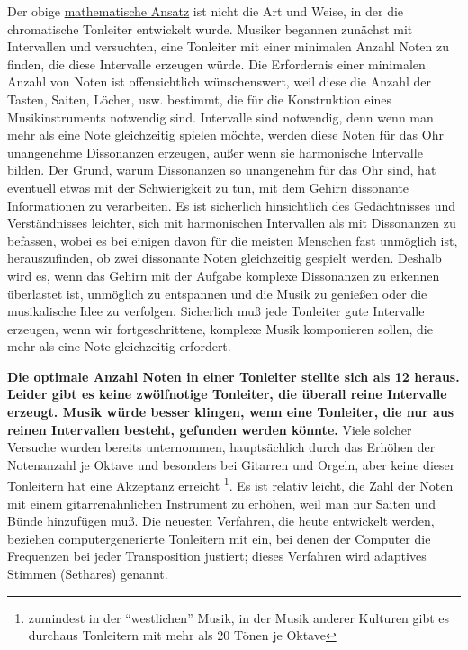 Der obige \hyperlink{c2_2b}{mathematische Ansatz} ist nicht die Art und Weise, in der die chromatische Tonleiter entwickelt wurde.
 Musiker begannen zunächst mit Intervallen und versuchten, eine Tonleiter mit einer minimalen Anzahl Noten zu finden, die diese Intervalle erzeugen würde.
 Die Erfordernis einer minimalen Anzahl von Noten ist offensichtlich wünschenswert, weil diese die Anzahl der Tasten, Saiten, Löcher, usw. bestimmt, die für die Konstruktion eines Musikinstruments notwendig sind.
 Intervalle sind notwendig, denn wenn man mehr als eine Note gleichzeitig spielen möchte, werden diese Noten für das Ohr unangenehme Dissonanzen erzeugen, außer wenn sie harmonische Intervalle bilden.
 Der Grund, warum Dissonanzen so unangenehm für das Ohr sind, hat eventuell etwas mit der Schwierigkeit zu tun, mit dem Gehirn dissonante Informationen zu verarbeiten.
 Es ist sicherlich hinsichtlich des Gedächtnisses und Verständnisses leichter, sich mit harmonischen Intervallen als mit Dissonanzen zu befassen, wobei es bei einigen davon für die meisten Menschen fast unmöglich ist, herauszufinden, ob zwei dissonante Noten gleichzeitig gespielt werden.
 Deshalb wird es, wenn das Gehirn mit der Aufgabe komplexe Dissonanzen zu erkennen überlastet ist, unmöglich zu entspannen und die Musik zu genießen oder die musikalische Idee zu verfolgen.
 Sicherlich muß jede Tonleiter gute Intervalle erzeugen, wenn wir fortgeschrittene, komplexe Musik komponieren sollen, die mehr als eine Note gleichzeitig erfordert.
 

\textbf{Die optimale Anzahl Noten in einer Tonleiter stellte sich als 12 heraus.
 Leider gibt es keine zwölfnotige Tonleiter, die überall reine Intervalle erzeugt.
 Musik würde besser klingen, wenn eine Tonleiter, die nur aus reinen Intervallen besteht, gefunden werden könnte.}
 Viele solcher Versuche wurden bereits unternommen, hauptsächlich durch das Erhöhen der Notenanzahl je Oktave und besonders bei Gitarren und Orgeln, aber keine dieser Tonleitern hat eine Akzeptanz erreicht
 \footnote{zumindest in der \enquote{westlichen} Musik, in der Musik anderer Kulturen gibt es durchaus Tonleitern mit mehr als 20 Tönen je Oktave}.
 Es ist relativ leicht, die Zahl der Noten mit einem gitarrenähnlichen Instrument zu erhöhen, weil man nur Saiten und Bünde hinzufügen muß.
 Die neuesten Verfahren, die heute entwickelt werden, beziehen computergenerierte Tonleitern mit ein, bei denen der Computer die Frequenzen bei jeder Transposition justiert; dieses Verfahren wird adaptives Stimmen (Sethares) genannt.
 

